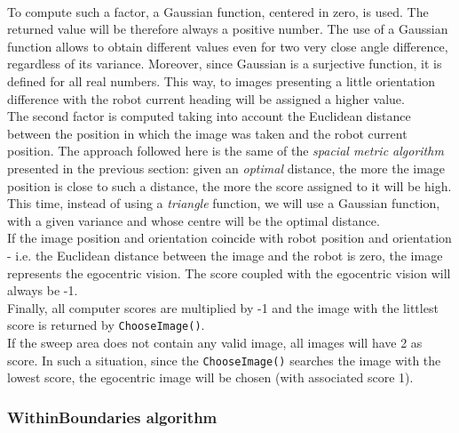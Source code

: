 \\
To compute such a factor, a Gaussian function, centered
in zero, is used. The returned value will be therefore 
always a positive number.
The use of a Gaussian function allows to obtain different 
values even for two very close angle difference, 
regardless of its variance. 
Moreover, since Gaussian is a surjective function, 
it is defined for all real numbers.
This way, to images presenting a little orientation difference with 
the robot current heading will be assigned a higher value.
\\
The second factor is computed taking into account the Euclidean 
distance between the position in which the image was taken 
and the robot current position. 
The approach followed here is the same of the \textit{spacial 
metric algorithm} presented in the previous section: 
given an \textit{optimal} distance, the more the image position 
is close to such a distance, the more the score assigned 
to it will be high.
This time, instead of using a \textit{triangle} function, 
we will use a Gaussian function, with a given variance and 
whose centre will be the optimal distance.
\\
If the image position and orientation coincide with robot position 
and orientation - i.e. the Euclidean distance between the image and 
the robot is zero, the image represents the egocentric vision. 
The score coupled with the egocentric vision will 
always be -1.
\\
Finally, all computer scores are multiplied by -1 and 
the image with the littlest score is returned by \texttt{ChooseImage()}.
\\
If the sweep area does not contain any valid image, all images will
have 2 as score. In such a situation, since the \texttt{ChooseImage()} 
searches the image with the lowest score, the egocentric image 
will be chosen (with associated score 1).

\subsubsection{WithinBoundaries algorithm}
\label{concr:iimageselector:spacial_metric_algorithm:withinboundaries}

